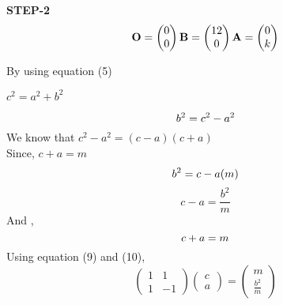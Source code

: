 \documentclass[10pt,a4paper]{report}
\let\vec\mathbf
\begin{document}
\begin{multicols}{2}
\textbf{STEP-2}\vspace{2mm}\\
\begin{equation}\vec{
    O=\begin{pmatrix}
0\\
0
\end{pmatrix} 
    B=\begin{pmatrix}
12\\
0
\end{pmatrix} 
    A=\begin{pmatrix}
0\\
k
 \end{pmatrix} } \vspace{3mm}
\end{equation}
  
By using equation (5)
\begin{center}
    $ c^2 =a^2 + b^2 $ \vspace{2mm}
\end{center}
\begin{equation}
    b^2 = c^2- a^2 \vspace{2mm}
\end{equation}
We know that $c^2- a^2 =  (c-a) (c+a)$\vspace{2mm}\\
Since, $ c+a=m$
\begin{equation}
  b^2 = c-a (m) \vspace{2mm}
\end{equation}
\begin{equation}
 c-a = \frac{b^2}{m}
\end{equation}
And ,
\begin{equation}
 c+a = m \vspace{2mm}
\end{equation}
Using equation (9) and (10),
\begin{equation}
  \begin{pmatrix}
1 & 1\\
1 &-1
\end{pmatrix} 
\begin{pmatrix}
c\\
a
\end{pmatrix} = \begin{pmatrix}
m\\
\frac{b^2}{m}
\end{pmatrix} 
\end{equation}\vspace{2mm}\\


\end{multicols}
\end{document}
